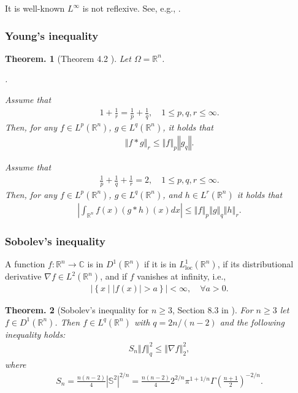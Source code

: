 \documentclass[openany, a4paper, oneside]{jsbook}
\newcounter{enum2}
\renewenvironment{enumerate}{%
\begin{list}%
{%
\arabic{enum2}.\ \,%
}%
{%
\usecounter{enum2}
\setlength{\itemindent}{0pt}%
\setlength{\leftmargin}{15pt}%
\setlength{\rightmargin}{0pt}%
\setlength{\labelsep}{0pt}%
\setlength{\labelwidth}{6pt}%
\setlength{\itemsep}{0pt}%
\setlength{\parsep}{0pt}%
\setlength{\listparindent}{0pt}%
}
}{%
\end{list}%
}
\theoremstyle{break}
\theoremstyle{breakdefn}
\newtheorem{thm}{Theorem.}[section]
\newcommand{\abs}[1]{\left|#1\right|}
\newcommand{\norm}[1]{\left\Vert#1\right\Vert}
\newcommand{\twonorm}[1]{\norm{#1}_2}
\newcommand{\rbk}[1]{\left (#1\right)}
\newcommand{\relmiddle}[1]{\mathrel{}\middle#1\mathrel{}}
\newcommand{\set}[2]{\left\{#1 \relmiddle| #2\right\}}
\newcommand{\bbC}{\mathbb{C}}
\newcommand{\bbR}{\mathbb{R}}
\newcommand{\bbRn}{\mathbb{R}^n}
\newcommand{\bbS}{\mathbb{S}}
\newcommand{\Loneloc}{L_{\mathrm{loc}}^1}
\newcommand{\LtwoRn}{L^2 \rbk{\bbR^n}}
\begin{document}
It is well-known $L^{\infty}$ is not reflexive.
See, e.g., \cite{HaimBrezis1, HaimBrezis2}.
\subsubsection{Young's inequality}


\begin{thm}[Theorem 4.2 \cite{LiebLoss1}]\label{Lieb-Loss_Analysis_chap11_37}
 Let $\Omega = \bbRn$.
\begin{enumerate}
\item Assume that
    \begin{align}
     1 + \frac{1}{r} = \frac{1}{p} + \frac{1}{q}, \quad 1 \leq p, q, r \leq \infty.
    \end{align}
    Then, for any $f \in L^p (\bbRn)$, $g \in L^q (\bbRn)$, it holds that
    \begin{align}
     \norm{f * g}_r
     \leq
     \norm{f}_p \norm{g_q}.
    \end{align}
\item Assume that
    \begin{align}
      \frac{1}{p} + \frac{1}{q} + \frac{1}{r} = 2, \quad 1 \leq p, q, r \leq \infty.
    \end{align}
    Then, for any $f \in L^p (\bbRn)$, $g \in L^q (\bbRn)$, and $h \in L^r \rbk{\bbRn}$ it holds that
    \begin{align}
     \abs{\int_{\bbRn} f (x) \rbk{g * h} (x) dx}
     \leq
     \norm{f}_p \norm{g}_q \norm{h}_r.
    \end{align}
\end{enumerate}
\end{thm}
\subsubsection{Sobolev's inequality}


A function $f \colon \bbRn \to \bbC$ is in $D^1 (\bbRn)$ if it is in $\Loneloc (\bbRn)$, if its distributional derivative $\nabla f \in \LtwoRn$,
and if $f$ vanishes at infinity, i.e.,
\begin{align}
 \abs{\set{x}{\abs{f (x)} > a}} < \infty, \quad \forall a > 0.
\end{align}
\begin{thm}[Sobolev's inequality for $n \geq 3$, Section 8.3 in \cite{LiebLoss1}]\label{Lieb-Loss_Analysis_chap11_4}
 For $n \geq 3$ let $f \in D^1 (\bbRn)$.
 Then $f \in L^q (\bbRn)$ with $q = 2n/ (n-2)$ and the following inequality holds:
\begin{align}
 S_n \norm{f}_{q}^2
 \leq
 \twonorm{\nabla f}^2,
\end{align}
where
\begin{align}
 S_n
 =
 \frac{n (n-2)}{4} \abs{\bbS^2}^{2/n}
 =
 \frac{n (n-2)}{4} 2^{2/n} \pi^{1 + 1/n} \Gamma \rbk{\frac{n+1}{2}}^{-2/n}.
\end{align}
\end{thm}
\end{document}
